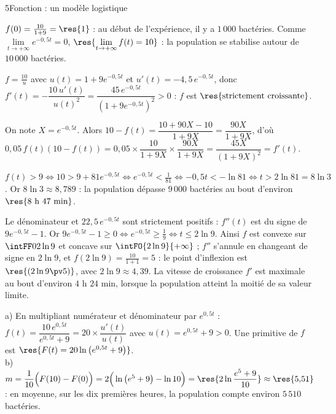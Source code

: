 \begin{corrigeBac}{5}{Fonction : un modèle logistique}
\begin{questions}
  \item $f(0)=\frac{10}{1+9}=\res{1}$ : au début de l'expérience, il y a $1\,000$ bactéries. Comme $\lim\limits_{t\to+\infty}e^{-0{,}5t}=0$,
    $\res{\lim\limits_{t\to+\infty}f(t)=10}$ : la population se stabilise autour de $10\,000$ bactéries. 
  \item $f=\frac{10}{u}$ avec $u(t)=1+9e^{-0{,}5t}$ et $u'(t)=-4{,}5\,e^{-0{,}5t}$, donc
    $f'(t)=-\dfrac{10\,u'(t)}{u(t)^{2}}=\dfrac{45\,e^{-0{,}5t}}{\left(1+9e^{-0{,}5t}\right)^{2}}>0$ : $f$ est $\res{\text{strictement croissante}}$. 
  \item On note $X=e^{-0{,}5t}$. Alors $10-f(t)=\dfrac{10+90X-10}{1+9X}=\dfrac{90X}{1+9X}$, d'où
    $0{,}05\,f(t)\left(10-f(t)\right)=0{,}05\times\dfrac{10}{1+9X}\times\dfrac{90X}{1+9X}=\dfrac{45X}{(1+9X)^{2}}=f'(t)$. 
  \item $f(t)>9\iff10>9+81e^{-0{,}5t}\iff e^{-0{,}5t}<\frac1{81}\iff-0{,}5t<-\ln81\iff t>2\ln81=8\ln3$. Or $8\ln3\approx8{,}789$ :
    la population dépasse $9\,000$ bactéries au bout d'environ $\res{8\text{ h }47\text{ min}}$. 
  \item Le dénominateur et $22{,}5\,e^{-0{,}5t}$ sont strictement positifs : $f''(t)$ est du signe de $9e^{-0{,}5t}-1$. Or
    $9e^{-0{,}5t}-1\geq0\iff e^{-0{,}5t}\geq\frac19\iff t\leq2\ln9$. Ainsi $f$ est convexe sur $\intFF0{2\ln9}$ et concave sur
    $\intFO{2\ln9}{+\infty}$ ; $f''$ s'annule en changeant de signe en $2\ln9$, et $f(2\ln9)=\frac{10}{1+1}=5$ : le point d'inflexion est
    $\res{\left(2\ln9\pv5\right)}$, avec $2\ln9\approx4{,}39$. La vitesse de croissance $f'$ est maximale au bout d'environ $4$ h $24$ min,
    lorsque la population atteint la moitié de sa valeur limite. \pts{1 pt}
  \item a) En multipliant numérateur et dénominateur par $e^{0{,}5t}$ : $f(t)=\dfrac{10\,e^{0{,}5t}}{e^{0{,}5t}+9}=20\times\dfrac{u'(t)}{u(t)}$
    avec $u(t)=e^{0{,}5t}+9>0$. Une primitive de $f$ est $\res{F(t)=20\ln\left(e^{0{,}5t}+9\right)}$.\\
    b) $m=\dfrac{1}{10}\Big(F(10)-F(0)\Big)=2\Big(\ln\left(e^{5}+9\right)-\ln10\Big)=\res{2\ln\dfrac{e^{5}+9}{10}}\approx\res{5{,}51}$ : en
    moyenne, sur les dix premières heures, la population compte environ $5\,510$ bactéries. 
\end{questions}
\end{corrigeBac}
